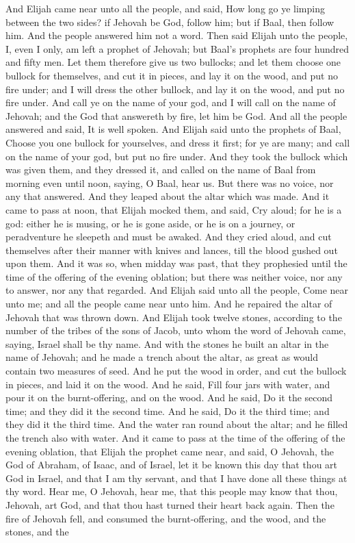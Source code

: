 And Elijah came near unto all the people, and said, How long go ye limping between the two sides? if Jehovah be God, follow him; but if Baal, then follow him. And the people answered him not a word. Then said Elijah unto the people, I, even I only, am left a prophet of Jehovah; but Baal’s prophets are four hundred and fifty men. Let them therefore give us two bullocks; and let them choose one bullock for themselves, and cut it in pieces, and lay it on the wood, and put no fire under; and I will dress the other bullock, and lay it on the wood, and put no fire under. And call ye on the name of your god, and I will call on the name of Jehovah; and the God that answereth by fire, let him be God. And all the people answered and said, It is well spoken.  And Elijah said unto the prophets of Baal, Choose you one bullock for yourselves, and dress it first; for ye are many; and call on the name of your god, but put no fire under. And they took the bullock which was given them, and they dressed it, and called on the name of Baal from morning even until noon, saying, O Baal, hear us. But there was no voice, nor any that answered. And they leaped about the altar which was made. And it came to pass at noon, that Elijah mocked them, and said, Cry aloud; for he is a god: either he is musing, or he is gone aside, or he is on a journey, or peradventure he sleepeth and must be awaked. And they cried aloud, and cut themselves after their manner with knives and lances, till the blood gushed out upon them. And it was so, when midday was past, that they prophesied until the time of the offering of the evening oblation; but there was neither voice, nor any to answer, nor any that regarded.  And Elijah said unto all the people, Come near unto me; and all the people came near unto him. And he repaired the altar of Jehovah that was thrown down. And Elijah took twelve stones, according to the number of the tribes of the sons of Jacob, unto whom the word of Jehovah came, saying, Israel shall be thy name. And with the stones he built an altar in the name of Jehovah; and he made a trench about the altar, as great as would contain two measures of seed. And he put the wood in order, and cut the bullock in pieces, and laid it on the wood. And he said, Fill four jars with water, and pour it on the burnt-offering, and on the wood. And he said, Do it the second time; and they did it the second time. And he said, Do it the third time; and they did it the third time. And the water ran round about the altar; and he filled the trench also with water. And it came to pass at the time of the offering of the evening oblation, that Elijah the prophet came near, and said, O Jehovah, the God of Abraham, of Isaac, and of Israel, let it be known this day that thou art God in Israel, and that I am thy servant, and that I have done all these things at thy word. Hear me, O Jehovah, hear me, that this people may know that thou, Jehovah, art God, and that thou hast turned their heart back again. Then the fire of Jehovah fell, and consumed the burnt-offering, and the wood, and the stones, and the 